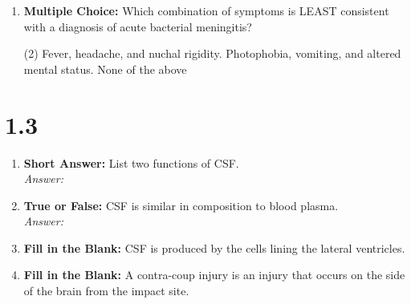 \begin{enumerate}[label=\textbf{Q1.2.\arabic*}]
      \item \textbf{Multiple Choice:} Which combination of symptoms is LEAST consistent with a diagnosis of acute bacterial meningitis?
            \begin{tasks}[label=(\Alph*), label-width=1.5em, item-indent=1.7em](2)
                  \task Fever, headache, and nuchal rigidity.
                  \task Photophobia, vomiting, and altered mental status.
                  \task None of the above
            \end{tasks}
\end{enumerate}

\section*{1.3 \squigglyline}
\begin{enumerate}[label=\textbf{Q1.3.\arabic*}]
      \item \textbf{Short Answer:} List two functions of CSF. \\
            \textit{Answer:} \\%

      \item \textbf{True or False:} CSF is similar in composition to blood plasma. \\
            \textit{Answer:} %

      \item \textbf{Fill in the Blank:} CSF is produced by the \underline{\hspace{3cm}} cells lining the lateral ventricles.

      \item \textbf{Fill in the Blank:} A contra-coup injury is an injury that occurs on the \underline{\hspace{3cm}} side of the brain from the impact site.
\end{enumerate}

